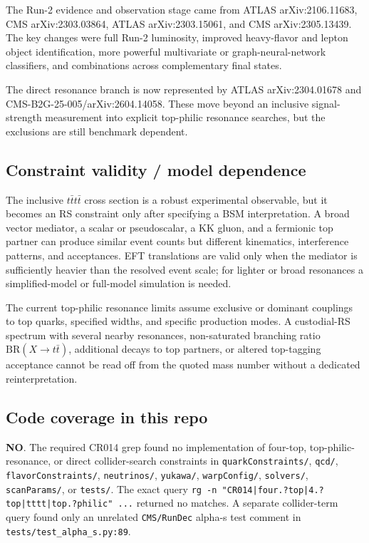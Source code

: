The Run-2 evidence and observation stage came from ATLAS arXiv:2106.11683,
CMS arXiv:2303.03864, ATLAS arXiv:2303.15061, and CMS arXiv:2305.13439.
The key changes were full Run-2 luminosity, improved heavy-flavor and lepton
object identification, more powerful multivariate or graph-neural-network
classifiers, and combinations across complementary final states.

The direct resonance branch is now represented by ATLAS arXiv:2304.01678 and
CMS-B2G-25-005/arXiv:2604.14058.  These move beyond an inclusive signal-strength
measurement into explicit top-philic resonance searches, but the exclusions are
still benchmark dependent.

\subsection*{Constraint validity / model dependence}
The inclusive \(t\bar t t\bar t\) cross section is a robust experimental
observable, but it becomes an RS constraint only after specifying a BSM
interpretation.  A broad vector mediator, a scalar or pseudoscalar, a KK gluon,
and a fermionic top partner can produce similar event counts but different
kinematics, interference patterns, and acceptances.  EFT translations are valid
only when the mediator is sufficiently heavier than the resolved event scale;
for lighter or broad resonances a simplified-model or full-model simulation is
needed.

The current top-philic resonance limits assume exclusive or dominant couplings
to top quarks, specified widths, and specific production modes.  A custodial-RS
spectrum with several nearby resonances, non-saturated branching ratio
\(\mathrm{BR}(X\to t\bar t)\), additional decays to top partners, or altered
top-tagging acceptance cannot be read off from the quoted mass number without a
dedicated reinterpretation.

\subsection*{Code coverage in this repo}
\textbf{NO}.  The required CR014 grep found no implementation of four-top,
top-philic-resonance, or direct collider-search constraints in
\texttt{quarkConstraints/}, \texttt{qcd/}, \texttt{flavorConstraints/},
\texttt{neutrinos/}, \texttt{yukawa/}, \texttt{warpConfig/},
\texttt{solvers/}, \texttt{scanParams/}, or \texttt{tests/}.  The exact query
\texttt{rg -n "CR014|four.?top|4.?top|tttt|top.?philic" ...} returned no
matches.  A separate collider-term query found only an unrelated
\texttt{CMS/RunDec} alpha-s test comment in \texttt{tests/test\_alpha\_s.py:89}.

